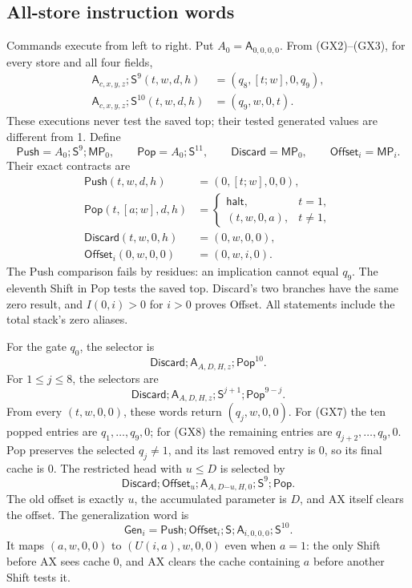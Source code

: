 \subsection{All-store instruction words}

Commands execute from left to right.  Put $A_0=\mathsf A_{0,0,0,0}$.
From (GX2)--(GX3), for every store and all four fields,
\begin{align*}
 \mathsf A_{c,x,y,z};\mathsf S^9(t,w,d,h)
       &=(q_8,[t;w],0,q_9),\\
 \mathsf A_{c,x,y,z};\mathsf S^{10}(t,w,d,h)
       &=(q_9,w,0,t).
\end{align*}
These executions never test the saved top; their tested generated values
are different from 1.  Define
\[
 \mathsf{Push}=A_0;\mathsf S^9;\mathsf{MP}_0,\qquad
 \mathsf{Pop}=A_0;\mathsf S^{11},\qquad
 \mathsf{Discard}=\mathsf{MP}_0,\qquad
 \mathsf{Offset}_i=\mathsf{MP}_i.
\]
Their exact contracts are
\begin{align*}
 \mathsf{Push}(t,w,d,h)&=(0,[t;w],0,0),\\
 \mathsf{Pop}(t,[a;w],d,h)
   &=\begin{cases}\mathsf{halt},&t=1,\\(t,w,0,a),&t\ne1,\end{cases}\\
 \mathsf{Discard}(t,w,0,h)&=(0,w,0,0),\\
 \mathsf{Offset}_i(0,w,0,0)&=(0,w,i,0).
\end{align*}
The Push comparison fails by residues: an implication cannot equal $q_9$.
The eleventh Shift in Pop tests the saved top.  Discard's two branches
have the same zero result, and $I(0,i)>0$ for $i>0$ proves Offset.
All statements include the total stack's zero aliases.

For the gate $q_0$, the selector is
\[
        \mathsf{Discard};\mathsf A_{A,D,H,z};\mathsf{Pop}^{10}.
                                                               \tag{GX7}
\]
For $1\le j\le8$, the selectors are
\[
 \mathsf{Discard};\mathsf A_{A,D,H,z};
                    \mathsf S^{j+1};\mathsf{Pop}^{9-j}.        \tag{GX8}
\]
From every $(t,w,0,0)$, these words return $(q_j,w,0,0)$.
For (GX7) the ten popped entries are $q_1,\ldots,q_9,0$; for (GX8)
the remaining entries are $q_{j+2},\ldots,q_9,0$.
Pop preserves the selected $q_j\ne1$, and its last removed entry is 0,
so its final cache is 0.  The restricted head with $u\le D$ is selected by
\[
 \mathsf{Discard};\mathsf{Offset}_u;
 \mathsf A_{A,D\mathbin{\dot-}u,H,0};\mathsf S^9;\mathsf{Pop}.
                                                               \tag{GX9}
\]
The old offset is exactly $u$, the accumulated parameter is $D$, and AX
itself clears the offset.  The generalization word is
\[
 \mathsf{Gen}_i=\mathsf{Push};\mathsf{Offset}_i;\mathsf S;
                  \mathsf A_{i,0,0,0};\mathsf S^{10}.           \tag{GX10}
\]
It maps $(a,w,0,0)$ to $(U(i,a),w,0,0)$ even when $a=1$:
the only Shift before AX sees cache 0, and AX clears the cache containing
$a$ before another Shift tests it.

